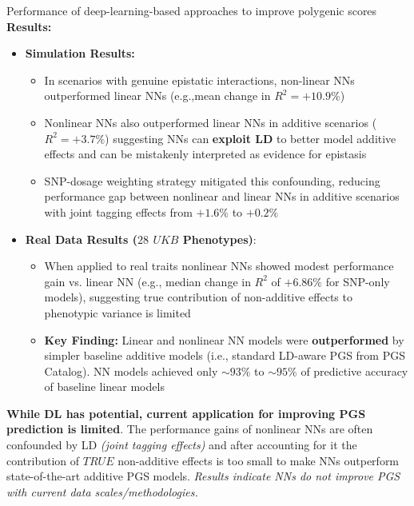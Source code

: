 \documentclass[twocolumn]{article}
\begin{document}
\begin{literaturepaper}{Performance of deep-learning-based approaches to improve polygenic scores \cite{Kelemen2025PolygenicScores}}
\textbf{Results:}
\begin{itemize}
    \item \textbf{Simulation Results:}
    \begin{itemize}
        \item In scenarios with genuine epistatic interactions, non-linear NNs outperformed linear NNs (e.g.,mean change in $R^2 = +10.9\%$)
        \item Nonlinear NNs also outperformed linear NNs in additive scenarios ($R^2 = +3.7\%$) suggesting NNs can \textbf{exploit LD} to better model additive effects and can be mistakenly interpreted as evidence for epistasis 
        \item SNP-dosage weighting strategy mitigated this confounding, reducing performance gap between nonlinear and linear NNs in additive scenarios with joint tagging effects from $+1.6\%$ to  $+0.2\%$
    \end{itemize}
    \item \textbf{Real Data Results ($28$ $UKB$ Phenotypes)}:
    \begin{itemize}
        \item When applied to real traits nonlinear NNs showed modest performance gain vs. linear NN (e.g., median change in $R^2$ of $+6.86\%$ for SNP-only models), suggesting true contribution of non-additive effects to phenotypic variance is limited
        \item \textbf{Key Finding:} Linear and nonlinear NN models were \textbf{outperformed} by simpler baseline additive models (i.e., standard LD-aware PGS from PGS Catalog). NN models achieved only $\sim93\%$ to $\sim95\%$ of predictive accuracy of baseline linear models 
    \end{itemize}
\end{itemize}

\textbf{While DL has potential, current application for improving PGS prediction is limited}. The performance gains of nonlinear NNs are often confounded by LD \textit{(joint tagging effects)} and after accounting for it the contribution of $TRUE$ non-additive effects is too small to make NNs outperform state-of-the-art additive PGS models. \textit{Results indicate NNs do not improve PGS with current data scales/methodologies.}

\end{literaturepaper}

\end{document}
